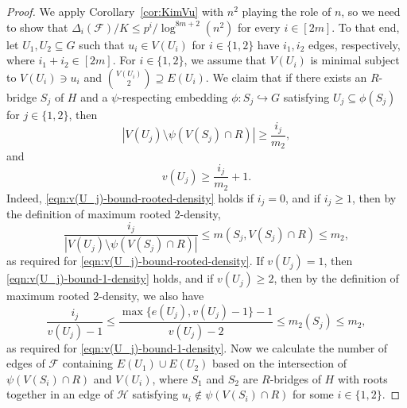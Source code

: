\documentclass[11pt]{article}
\numberwithin{equation}{section}
\newcounter{i}
\theoremstyle{plain}
\theoremstyle{plain} %
\theoremstyle{definition}
\newcommand{\cF}{\mathcal{F}}
\newcommand{\cH}{\mathcal{H}}
\begin{document}
\begin{proof}
We apply Corollary~\ref{cor:KimVu} with $n^2$ playing the role of $n$, so we need to show that $\Delta_i(\cF) / K \leq p^i /  \log^{8m+2}(n^2)$ for every $i \in [2m]$.  
To that end, let $U_1,U_2 \subseteq G$ such that $u_i \in V(U_i)$ for $i\in\{1,2\}$ have $i_1,i_2$ edges, respectively, where $i_1 + i_2 \in [2m]$.  For $i \in \{1,2\}$, we assume that $V(U_i)$ is minimal subject to $V(U_i) \ni u_i$ and $\binom{V(U_i)}{2}\supseteq E(U_i)$.
We claim that if there exists an $R$-bridge $S_j$ of $H$ and a $\psi$-respecting embedding $\phi : S_j \hookrightarrow G$ satisfying $U_j \subseteq \phi(S_j)$ for $j \in \{1,2\}$, then
\begin{equation}\label{eqn:v(U_j)-bound-rooted-density}
    |V(U_j)\setminus \psi(V(S_j)\cap R)| \geq \frac{i_j}{m_2},
\end{equation}
and 
\begin{equation}\label{eqn:v(U_j)-bound-1-density}
    v(U_j) \geq \frac{i_j}{m_2} + 1.
\end{equation}
Indeed, \eqref{eqn:v(U_j)-bound-rooted-density} holds if $i_j = 0$, and if $i_j \geq 1$, then by the definition of maximum rooted 2-density, 
\begin{equation*}
     \frac{i_j}{|V(U_j)\setminus \psi(V(S_j)\cap R)|} \leq m(S_j, V(S_j) \cap R) \leq m_2,
\end{equation*}
as required for \eqref{eqn:v(U_j)-bound-rooted-density}.
If $v(U_j) = 1$, then \eqref{eqn:v(U_j)-bound-1-density} holds, and if $v(U_j) \geq 2$, then by the definition of maximum rooted 2-density, we also have
\begin{equation*}
     \frac{i_j}{v(U_j) - 1} \leq \frac{\max\{e(U_j), v(U_j)-1\}-1}{v(U_j) - 2} \leq m_2(S_j) \leq m_2,%
\end{equation*}
as required for \eqref{eqn:v(U_j)-bound-1-density}.  
Now we calculate the number of edges of $\cF$ containing $E(U_1) \cup E(U_2)$ based on the intersection of $\psi(V(S_i) \cap R)$ and $V(U_i)$, where $S_1$ and $S_2$ are $R$-bridges of $H$ with roots together in an edge of $\cH$ satisfying $u_i \notin \psi(V(S_i) \cap R)$ for some $i \in \{1,2\}$.  


\end{proof}
\end{document}
